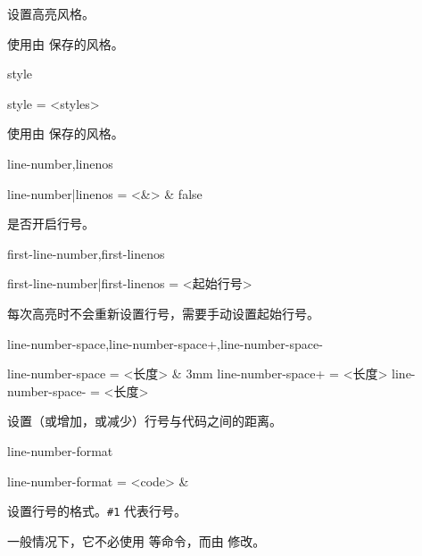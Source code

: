 \documentclass[class=article,openany]{cusdoc}[2025/09/29]
\begin{document}
\begin{function}{\THSaveStyle}
  \begin{syntax}
    \V\THSaveStyle {} 
  \end{syntax}
设置高亮风格。
\end{function}

\begin{function}{\THUseSavedStyle}
  \begin{syntax}
    \V\THUseSavedStyle {}
  \end{syntax}
使用由  保存的风格。
\end{function}

\begin{keyval}[path=high]{style}
  \begin{syntax}
    style = <styles>
  \end{syntax}
使用由  保存的风格。
\end{keyval}

\begin{keyval}[path=high]{line-number,linenos}
  \begin{syntax}
    line-number|linenos = <&\TTF> & false
  \end{syntax}
是否开启行号。
\end{keyval}

\begin{keyval}[path=high]{first-line-number,first-linenos}
  \begin{syntax}
    first-line-number|first-linenos = <起始行号>
  \end{syntax}
 每次高亮时不会重新设置行号，需要手动设置起始行号。
\end{keyval}

\begin{keyval}[path=high]{line-number-space,line-number-space+,line-number-space-}
  \begin{syntax}
    line-number-space  = <长度> & 3mm
    line-number-space+ = <长度>
    line-number-space- = <长度>
  \end{syntax}
设置（或增加，或减少）行号与代码之间的距离。
\end{keyval}

\begin{keyval}[path=high]{line-number-format}
  \begin{syntax}
    line-number-format = <code> & 
  \end{syntax}
设置行号的格式。\verb|#1| 代表行号。

一般情况下，它不必使用  等命令，而由  修改。
\end{keyval}
\end{document}
